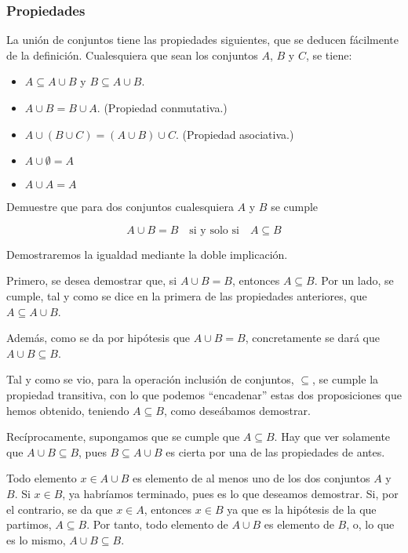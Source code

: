 \subsubsection{Propiedades}

La unión de conjuntos tiene las propiedades siguientes, que se deducen
fácilmente de la definición. Cualesquiera que sean los conjuntos $A$, $B$ y
$C$, se tiene:

\begin{itemize}
  \item $A \subseteq A \cup B$ y $B \subseteq A \cup B$.
  \item $A \cup B = B \cup A$. (Propiedad conmutativa.)
  \item $A \cup (B \cup C) = (A \cup B) \cup C$. (Propiedad asociativa.)
  \item $A \cup \emptyset = A$
  \item $A \cup A = A$
\end{itemize}

\begin{exercise}
  Demuestre que para dos conjuntos cualesquiera $A$ y $B$ se cumple

  \[ A \cup B = B \quad \text{si y solo si} \quad A \subseteq B \]

  Demostraremos la igualdad mediante la doble implicación.

  Primero, se desea demostrar que, si $A \cup B = B$, entonces $A \subseteq
  B$. Por un lado, se cumple, tal y como se dice en la primera de las
  propiedades anteriores, que $A \subseteq A \cup B$.

  Además, como se da por hipótesis que $A \cup B = B$, concretamente se dará
  que $A \cup B \subseteq B$.

  Tal y como se vio, para la operación inclusión de conjuntos, $\subseteq$,
  se cumple la propiedad transitiva, con lo que podemos ``encadenar'' estas
  dos proposiciones que hemos obtenido, teniendo $A \subseteq B$, como
  deseábamos demostrar.

  Recíprocamente, supongamos que se cumple que $A \subseteq B$. Hay que ver
  solamente que $A \cup B \subseteq B$, pues $B \subseteq A \cup B$ es
  cierta por una de las propiedades de antes.

  Todo elemento $x \in A \cup B$ es elemento de al menos uno de los dos
  conjuntos $A$ y $B$. Si $x \in B$, ya habríamos terminado, pues es lo que
  deseamos demostrar. Si, por el contrario, se da que $x \in A$, entonces $x
  \in B$ ya que es la hipótesis de la que partimos, $A \subseteq B$. Por
  tanto, todo elemento de $A \cup B$ es elemento de $B$, o, lo que es lo
  mismo, $ A \cup B \subseteq B$.
\end{exercise}




